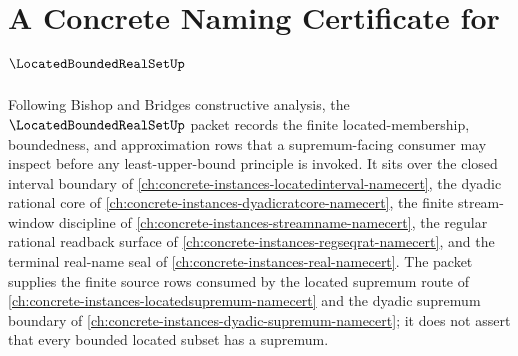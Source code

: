 \chapter{A Concrete Naming Certificate for $\LocatedBoundedRealSetUp$}
\label{ch:concrete-instances-located-bounded-real-set-namecert}

Following Bishop and Bridges constructive analysis, the $\LocatedBoundedRealSetUp$ packet records the finite located-membership, boundedness, and approximation rows that a supremum-facing consumer may inspect before any least-upper-bound principle is invoked. It sits over the closed interval boundary of \autoref{ch:concrete-instances-locatedinterval-namecert}, the dyadic rational core of \autoref{ch:concrete-instances-dyadicratcore-namecert}, the finite stream-window discipline of \autoref{ch:concrete-instances-streamname-namecert}, the regular rational readback surface of \autoref{ch:concrete-instances-regseqrat-namecert}, and the terminal real-name seal of \autoref{ch:concrete-instances-real-namecert}. The packet supplies the finite source rows consumed by the located supremum route of \autoref{ch:concrete-instances-locatedsupremum-namecert} and the dyadic supremum boundary of \autoref{ch:concrete-instances-dyadic-supremum-namecert}; it does not assert that every bounded located subset has a supremum.

